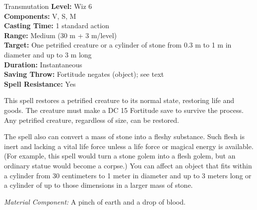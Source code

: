 {Transmutation}
{
	\textbf{Level:}
	Wiz 6\\
	\textbf{Components:}
	V, S, M\\
	\textbf{Casting Time:}
	1 standard action\\
	\textbf{Range:}
	Medium (30 m + 3 m/level)\\
	\textbf{Target:}
	One petrified creature or a cylinder of stone from 0.3 m to 1 m in diameter and up to 3 m long\\
	\textbf{Duration:}
	Instantaneous\\
	\textbf{Saving Throw:}
	Fortitude negates (object); see text\\
	\textbf{Spell Resistance:}
	Yes\\
}
{
	This spell restores a petrified creature to its normal state, restoring life and goods. The creature must make a DC 15 Fortitude save to survive the process. Any petrified creature, regardless of size, can be restored.

	The spell also can convert a mass of stone into a fleshy substance. Such flesh is inert and lacking a vital life force unless a life force or magical energy is available. (For example, this spell would turn a stone golem into a flesh golem, but an ordinary statue would become a corpse.) You can affect an object that fits within a cylinder from 30 centimeters to 1 meter in diameter and up to 3 meters long or a cylinder of up to those dimensions in a larger mass of stone.

	\textit{Material Component:}
	A pinch of earth and a drop of blood.

}
